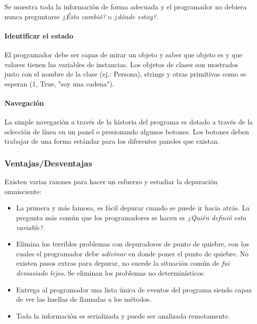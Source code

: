 \documentclass[12pt,legalpaper]{report}
\begin{document}
Se muestra toda la información de forma adecuada y el programador no debiera nunca preguntarse \textit{¿Ésto cambió?} o \textit{¿dónde estoy?}.

				\paragraph{Identificar el estado}

El programador debe ser capas de mirar un objeto y saber que objeto es y que valores tienen las variables de instancias.  Los objetos de clases son mostrados justo con el nombre de la clase (ej.: Persona), strings y otras primitivas como se esperan (1, True, "soy una cadena").

				\paragraph{Navegación}

La simple navegación a través de la historia del programa es dotado a través de la selección de línea en un panel o presionando algunos botones.  Los botones deben trabajar de una forma estándar para los diferentes paneles que existan.


			\subsubsection{Ventajas/Desventajas}

Existen varias razones para hacer un esfuerzo y estudiar la depuración omnisciente:

\begin{itemize}
	\item La primera y más famosa, es fácil depurar cuando se puede ir hacia atrás.  La pregunta más común que los programadores se hacen es \textit{¿Quién definió esta variable?}.

	\item Elimina los terribles problemas con depuradores de punto de quiebre, con los cuales el programador debe \textit{adivinar} en donde poner el punto de quiebre.  No existen pasos extras para depurar, no sucede la situación común de \textit{fui demasiado lejos}.  Se eliminan los problemas no determinísticos.

	\item Entrega al programador una lista única de eventos del programa siendo capaz de ver las huellas de llamadas a los métodos.

	\item Toda la información es serializada y puede ser analizada remotamente.
\end{itemize}
\end{document}
